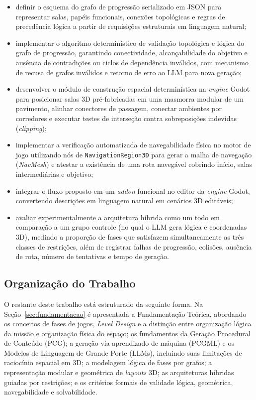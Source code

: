 \begin{itemize}
    \item definir o esquema do grafo de progressão serializado em JSON para representar salas, papéis funcionais, conexões topológicas e regras de precedência lógica a partir de requisições estruturais em linguagem natural;
    \item implementar o algoritmo determinístico de validação topológica e lógica do grafo de progressão, garantindo conectividade, alcançabilidade do objetivo e ausência de contradições ou ciclos de dependência inválidos, com mecanismo de recusa de grafos inválidos e retorno de erro ao LLM para nova geração;
    \item desenvolver o módulo de construção espacial determinística na \textit{engine} Godot para posicionar salas 3D pré-fabricadas em uma masmorra modular de um pavimento, alinhar conectores de passagem, conectar ambientes por corredores e executar testes de interseção contra sobreposições indevidas (\textit{clipping});
    \item implementar a verificação automatizada de navegabilidade física no motor de jogo utilizando nós de \texttt{NavigationRegion3D} para gerar a malha de navegação (\textit{NavMesh}) e atestar a existência de uma rota navegável cobrindo início, salas intermediárias e objetivo;
    \item integrar o fluxo proposto em um \textit{addon} funcional no editor da \textit{engine} Godot, convertendo descrições em linguagem natural em cenários 3D editáveis;
    \item avaliar experimentalmente a arquitetura híbrida como um todo em comparação a um grupo controle (no qual o LLM gera lógica e coordenadas 3D), medindo a proporção de fases que satisfazem simultaneamente as três classes de restrições, além de registrar falhas de progressão, colisões, ausência de rota, número de tentativas e tempo de geração.
\end{itemize}

\subsection{Organização do Trabalho}
\label{sec:organizacao_trabalho}

O restante deste trabalho está estruturado da seguinte forma. Na Seção~\ref{sec:fundamentacao} é apresentada a Fundamentação Teórica, abordando os conceitos de fases de jogos, \textit{Level Design} e a distinção entre organização lógica da missão e organização física do espaço; os fundamentos da Geração Procedural de Conteúdo (PCG); a geração via aprendizado de máquina (PCGML) e os Modelos de Linguagem de Grande Porte (LLMs), incluindo suas limitações de raciocínio espacial em 3D; a modelagem lógica de fases por grafos; a representação modular e geométrica de \textit{layouts} 3D; as arquiteturas híbridas guiadas por restrições; e os critérios formais de validade lógica, geométrica, navegabilidade e solvabilidade.

